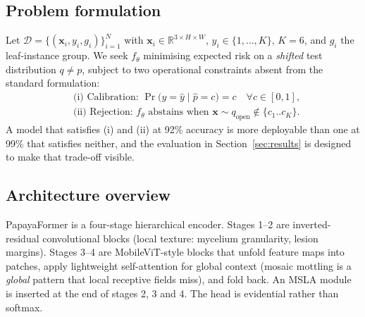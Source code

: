 \documentclass[10pt,twocolumn,a4paper]{article}
\newcommand{\R}{\mathbb{R}}
\newcommand{\x}{\mathbf{x}}
\begin{document}
\subsection{Problem formulation}
Let $\mathcal{D}=\{(\x_i,y_i,g_i)\}_{i=1}^{N}$ with $\x_i \in \R^{3\times H\times W}$, $y_i \in \{1,\dots,K\}$, $K=6$, and $g_i$ the leaf-instance group. We seek $f_\theta$ minimising expected risk on a \emph{shifted} test distribution $q \neq p$, subject to two operational constraints absent from the standard formulation:
\begin{align}
&\text{(i) Calibration: } \Pr\!\big(y=\hat{y}\;\big|\;\hat{p}=c\big) = c \quad \forall c \in [0,1],\\
&\text{(ii) Rejection: } f_\theta \text{ abstains when } \x \sim q_{\text{open}} \notin \{c_1..c_K\}.
\end{align}
A model that satisfies (i) and (ii) at 92\% accuracy is more deployable than one at 99\% that satisfies neither, and the evaluation in Section~\ref{sec:results} is designed to make that trade-off visible.

\subsection{Architecture overview}
\label{sec:model}
PapayaFormer is a four-stage hierarchical encoder. Stages 1--2 are inverted-residual convolutional blocks (local texture: mycelium granularity, lesion margins). Stages 3--4 are MobileViT-style blocks that unfold feature maps into patches, apply lightweight self-attention for global context (mosaic mottling is a \emph{global} pattern that local receptive fields miss), and fold back. An MSLA module is inserted at the end of stages 2, 3 and 4. The head is evidential rather than softmax.
\end{document}
